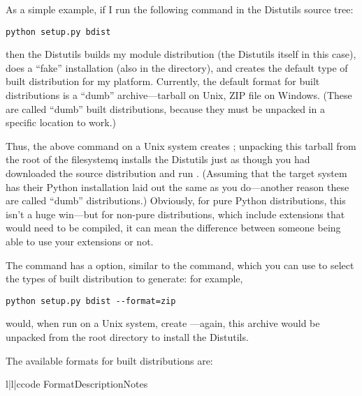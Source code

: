 \documentclass{howto}
\begin{document}
As a simple example, if I run the following command in the Distutils
source tree:
\begin{verbatim}
python setup.py bdist
\end{verbatim}
then the Distutils builds my module distribution (the Distutils itself
in this case), does a ``fake'' installation (also in the 
directory), and creates the default type of built distribution for my
platform.  Currently, the default format for built distributions is a
``dumb'' archive---tarball on Unix, ZIP file on Windows.  (These are
called ``dumb'' built distributions, because they must be unpacked in a
specific location to work.)

Thus, the above command on a Unix system creates
; unpacking this tarball
from the root of the filesystemq installs the Distutils just as though
you had downloaded the source distribution and run .  (Assuming that the target system has their Python
installation laid out the same as you do---another reason these are
called ``dumb'' distributions.)  Obviously, for pure Python
distributions, this isn't a huge win---but for non-pure distributions,
which include extensions that would need to be compiled, it can mean the
difference between someone being able to use your extensions or not.


The  command has a  option,
similar to the  command, which you can use to select the
types of built distribution to generate: for example,
\begin{verbatim}
python setup.py bdist --format=zip
\end{verbatim}
would, when run on a Unix system, create
---again, this archive would be
unpacked from the root directory to install the Distutils.

The available formats for built distributions are:
\begin{tableiii}{l|l|c}{code}%
  {Format}{Description}{Notes}
\end{tableiii}
\end{document}

